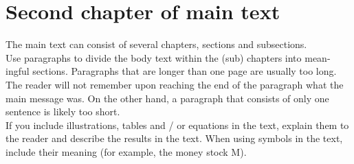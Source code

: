 \section{Second chapter of main text}

The main text can consist of several chapters, sections and subsections.\\
Use paragraphs to divide the body text within the (sub) chapters into mean-ingful sections. Paragraphs that are longer than one page are usually too long. The reader will not remember upon reaching the end of the paragraph what the main message was. On the other hand, a paragraph that consists of only one sentence is likely too short.\\
If you include illustrations, tables and / or equations in the text, explain them to the reader and describe the results in the text. When using symbols in the text, include their meaning (for example, the money stock M).


\newpage